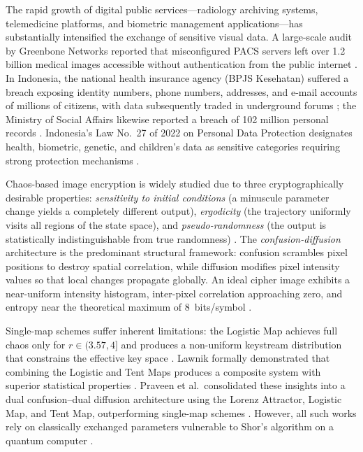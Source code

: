 \documentclass[conference]{IEEEtran}
\begin{document}
The rapid growth of digital public services---radiology archiving systems, telemedicine platforms, and biometric management applications---has substantially intensified the exchange of sensitive visual data. A large-scale audit by Greenbone Networks reported that misconfigured PACS servers left over 1.2 billion medical images accessible without authentication from the public internet \cite{b1}. In Indonesia, the national health insurance agency (BPJS Kesehatan) suffered a breach exposing identity numbers, phone numbers, addresses, and e-mail accounts of millions of citizens, with data subsequently traded in underground forums \cite{b2,b3}; the Ministry of Social Affairs likewise reported a breach of 102 million personal records \cite{b3}. Indonesia's Law No.~27 of 2022 on Personal Data Protection designates health, biometric, genetic, and children's data as sensitive categories requiring strong protection mechanisms \cite{b4}.

Chaos-based image encryption is widely studied due to three cryptographically desirable properties: \textit{sensitivity to initial conditions} (a minuscule parameter change yields a completely different output), \textit{ergodicity} (the trajectory uniformly visits all regions of the state space), and \textit{pseudo-randomness} (the output is statistically indistinguishable from true randomness) \cite{b9,b10}. The \textit{confusion-diffusion} architecture \cite{b12} is the predominant structural framework: confusion scrambles pixel positions to destroy spatial correlation, while diffusion modifies pixel intensity values so that local changes propagate globally. An ideal cipher image exhibits a near-uniform intensity histogram, inter-pixel correlation approaching zero, and entropy near the theoretical maximum of 8~bits/symbol \cite{b15}.

Single-map schemes suffer inherent limitations: the Logistic Map achieves full chaos only for $r \in (3.57, 4]$ and produces a non-uniform keystream distribution that constrains the effective key space \cite{b25}. Lawnik formally demonstrated that combining the Logistic and Tent Maps produces a composite system with superior statistical properties \cite{b25}. Praveen et al.\ consolidated these insights into a dual confusion--dual diffusion architecture using the Lorenz Attractor, Logistic Map, and Tent Map, outperforming single-map schemes \cite{b26,b29}. However, all such works rely on classically exchanged parameters vulnerable to Shor's algorithm on a quantum computer \cite{b18}.
\end{document}
